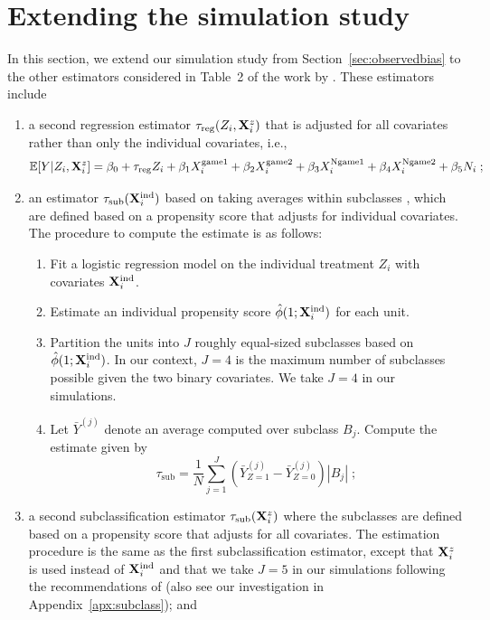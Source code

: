 \documentclass[10pt]{article}
\begin{document}
\section{Extending the simulation study} \label{sec:extension}

In this section, we extend our simulation study from Section~\ref{sec:observedbias} to the other estimators considered in Table~2 of the work by \textcite{Forastiere:2021}. These estimators include
\begin{enumerate}

\item
a second regression estimator $\tau_\text{reg}(Z_i,\mathbf{X}_i^z)$ that is adjusted for all covariates rather than only the individual covariates, i.e.,
\[
\mathbb{E}[Y|Z_i,\mathbf{X}_i^z] = \beta_0 + \tau_\text{reg}Z_i + \beta_1X_i^\text{game1} + \beta_2X_i^\text{game2} + \beta_3X_i^\text{Ngame1} + \beta_4X_i^\text{Ngame2} + \beta_5N_i\;;
\]
\item
an estimator $\tau_\text{sub}(\mathbf{X}^{\text{ind}}_i)$ based on taking averages within subclasses \parencite{Imbens:2015}, which are defined based on a propensity score that adjusts for individual covariates. The procedure to compute the estimate is as follows:
\begin{enumerate}
\item
Fit a logistic regression model on the individual treatment $Z_i$ with covariates $\mathbf{X}^{\text{ind}}_i$.
\item
Estimate an individual propensity score $\hat{\phi}(1;\mathbf{X}^{\text{ind}}_i)$ for each unit.
\item
Partition the units into $J$ roughly equal-sized subclasses based on $\hat{\phi}(1;\mathbf{X}^{\text{ind}}_i)$. In our context, $J=4$ is the maximum number of subclasses possible given the two binary covariates. We take $J=4$ in our simulations.
\item
Let $\bar{Y}^{(j)}$ denote an average computed over subclass $B_j$. Compute the estimate given by
\[
\tau_\text{sub} = \frac{1}{N}\sum_{j=1}^J\left(\bar{Y}_{Z=1}^{(j)}-\bar{Y}_{Z=0}^{(j)}\right)|B_j| \;;
\]
\end{enumerate}

\item
a second subclassification estimator $\tau_\text{sub}(\mathbf{X}^z_i)$ where the subclasses are defined based on a propensity score that adjusts for all covariates. The estimation procedure is the same as the first subclassification estimator, except that $\mathbf{X}^z_i$ is used instead of $\mathbf{X}^{\text{ind}}_i$ and that we take $J=5$ in our simulations following the recommendations of \textcite{Rosenbaum:1984} (also see our investigation in Appendix~\ref{apx:subclass}); and


\end{enumerate}
\end{document}
